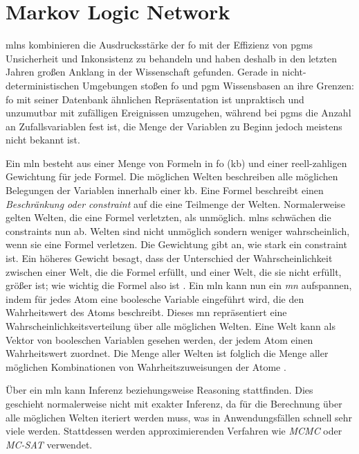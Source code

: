 \section{Markov Logic Network}
\label{sec:mln}
\glspl{mln} kombinieren die Ausdrucksstärke der \gls{fo} mit der Effizienz von \glspl{pgm}  Unsicherheit und Inkonsistenz zu behandeln und haben deshalb in den letzten Jahren großen Anklang in der Wissenschaft gefunden. Gerade in nicht-deterministischen Umgebungen stoßen \gls{fo} und \gls{pgm} Wissensbasen an ihre Grenzen: \gls{fo} mit seiner Datenbank ähnlichen Repräsentation ist unpraktisch und unzumutbar mit zufälligen Ereignissen umzugehen, während bei \glspl{pgm} die Anzahl an Zufallsvariablen fest ist, die Menge der Variablen zu Beginn jedoch meistens nicht bekannt ist. \cite{nyga17} \par 
Ein \gls{mln} besteht aus einer Menge von Formeln in \gls{fo} (\gls{kb}) und einer reell-zahligen Gewichtung für jede Formel. Die möglichen Welten beschreiben alle möglichen Belegungen der Variablen innerhalb einer \gls{kb}. Eine Formel beschreibt einen \textit{Beschränkung oder constraint} auf die eine Teilmenge der Welten. Normalerweise gelten Welten, die eine Formel verletzten, als unmöglich. \glspl{mln} schwächen die constraints nun ab. Welten sind nicht unmöglich sondern weniger wahrscheinlich, wenn sie eine Formel verletzen. Die Gewichtung gibt an, wie stark ein constraint ist. Ein höheres Gewicht besagt, dass der Unterschied der Wahrscheinlichkeit zwischen einer Welt, die die Formel erfüllt, und einer Welt, die sie nicht erfüllt, größer ist; wie wichtig die Formel also ist \cite{mln}. Ein \gls{mln} kann nun ein \textit{\gls{mn}} aufspannen, indem für jedes Atom eine boolesche Variable eingeführt wird, die den Wahrheitswert des Atoms beschreibt. Dieses \gls{mn} repräsentiert eine Wahrscheinlichkeitsverteilung über alle möglichen Welten. Eine Welt kann als Vektor von booleschen Variablen gesehen werden, der jedem Atom einen Wahrheitswert zuordnet. Die Menge aller Welten ist folglich die Menge aller möglichen Kombinationen von Wahrheitszuweisungen der Atome \cite{nyga17}. \par
Über ein \gls{mln} kann Inferenz beziehungsweise Reasoning stattfinden. Dies geschieht normalerweise nicht mit exakter Inferenz, da für die Berechnung über alle möglichen Welten iteriert werden muss, was in Anwendungsfällen schnell sehr viele werden. Stattdessen werden approximierenden Verfahren wie \textit{MCMC} oder \textit{MC-SAT} verwendet. \cite{nyga17} \par  

